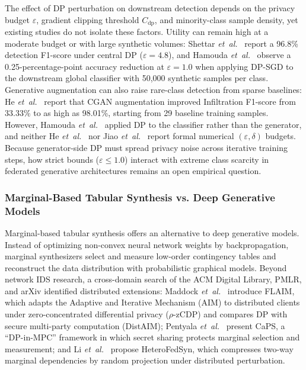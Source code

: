 The effect of DP perturbation on downstream detection depends on the privacy budget $\varepsilon$, gradient clipping threshold $C_{\text{dp}}$, and minority-class sample density, yet existing studies do not isolate these factors. Utility can remain high at a moderate budget or with large synthetic volumes: Shettar \textit{et~al.}~\cite{shettar2026} report a 96.8\% detection F1-score under central DP ($\varepsilon = 4.8$), and Hamouda \textit{et~al.}~\cite{hamouda2024} observe a 0.25-percentage-point accuracy reduction at $\varepsilon = 1.0$ when applying DP-SGD to the downstream global classifier with 50,000 synthetic samples per class. Generative augmentation can also raise rare-class detection from sparse baselines: He \textit{et~al.}~\cite{he2023} report that CGAN augmentation improved Infiltration F1-score from 33.33\% to as high as 98.01\%, starting from 29 baseline training samples. However, Hamouda \textit{et~al.}~\cite{hamouda2024} applied DP to the classifier rather than the generator, and neither He \textit{et~al.}~\cite{he2023} nor Jiao \textit{et~al.}~\cite{jiao2025} report formal numerical $(\varepsilon, \delta)$ budgets. Because generator-side DP must spread privacy noise across iterative training steps, how strict bounds ($\varepsilon \le 1.0$) interact with extreme class scarcity in federated generative architectures remains an open empirical question.

\subsubsection*{Marginal-Based Tabular Synthesis vs. Deep Generative Models}
Marginal-based tabular synthesis offers an alternative to deep generative models. Instead of optimizing non-convex neural network weights by backpropagation, marginal synthesizers select and measure low-order contingency tables and reconstruct the data distribution with probabilistic graphical models. Beyond network IDS research, a cross-domain search of the ACM Digital Library, PMLR, and arXiv identified distributed extensions: Maddock \textit{et~al.}~\cite{maddock2024} introduce FLAIM, which adapts the Adaptive and Iterative Mechanism (AIM) to distributed clients under zero-concentrated differential privacy ($\rho$-zCDP) and compares DP with secure multi-party computation (DistAIM); Pentyala \textit{et~al.}~\cite{pentyala2024} present CaPS, a ``DP-in-MPC'' framework in which secret sharing protects marginal selection and measurement; and Li \textit{et~al.}~\cite{li2026} propose HeteroFedSyn, which compresses two-way marginal dependencies by random projection under distributed perturbation.

